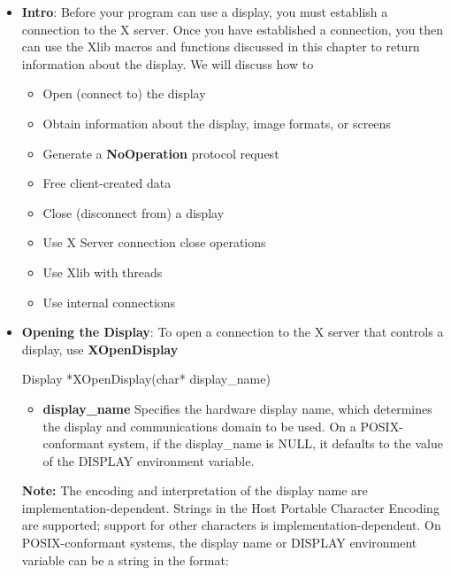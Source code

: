 \documentclass{report}
\begin{document}
    \pagebreak 
    \begin{itemize}
        \item \textbf{Intro}: Before your program can use a display, you must establish a connection to the X server. Once you have established a connection, you then can use the Xlib macros and functions discussed in this chapter to return information about the display. We will discuss how to 
            \begin{itemize}
                \item Open (connect to) the display
                \item Obtain information about the display, image formats, or screens
                \item Generate a \textbf{NoOperation} protocol request
                \item Free client-created data
                \item Close (disconnect from) a display
                \item Use X Server connection close operations
                \item Use Xlib with threads
                \item Use internal connections
            \end{itemize}
        \item \textbf{Opening the Display}: To open a connection to the X server that controls a display, use \textbf{XOpenDisplay}
            \bigbreak \noindent 
            \begin{cppcode}
            Display *XOpenDisplay(char* display_name)
            \end{cppcode}
            \begin{itemize}
                \item \textbf{display\_name} Specifies the hardware display name, which determines the display and communications domain to be used. On a POSIX-conformant system, if the display\_name is NULL, it defaults to the value of the DISPLAY environment variable.
            \end{itemize}
            \textbf{Note:} The encoding and interpretation of the display name are implementation-dependent. Strings in the Host Portable Character Encoding are supported; support for other characters is implementation-dependent. On POSIX-conformant systems, the display name or DISPLAY environment variable can be a string in the format:
            \begin{center}

\end{center}
\end{itemize}
\end{document}
